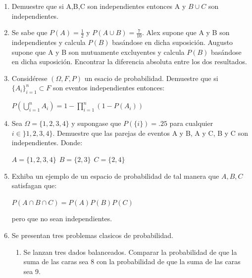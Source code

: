 \documentclass[12pt,a4paper]{report}
\begin{document}
\begin{enumerate}
   \item {
   Demuestre que si A,B,C son independientes entonces A y $B\cup C$ son independientes.

    }

   \item {
   Se sabe que $P(A)= \frac{1}{2}$ y $P(A\cup B)=\frac{7}{10}$. Alex supone que A y B son independientes y calcula $P(B)$ basándose en dicha suposición. Augusto supone que A y B son mutuamente excluyentes y calcula $P(B)$ basándose en dicha suposición. Encontrar la diferencia absoluta entre los dos resultados.
	}

   \item {
   Considérese $(\Omega,F, P)$ un esacio de probabilidad. Demuestre que si $\lbrace A_{i} \rbrace _{i=1}^{n} \subset F$ son eventos independientes entonces:\\
   \begin{center}
   $P(\bigcup\limits_{i=1}^{n} A_{i})=1-\prod\limits_{i=1}^{n} (1-P(A_{i}))$
   \end{center}
	}

   \item {
    Sea $\Omega = \lbrace 1,2,3,4 \rbrace$ y supongase que $P(\lbrace i \rbrace)=.25$ para cualquier $i\in \rbrace 1,2,3,4 \rbrace$. Demuestre que las parejas de eventos A y B, A y C, B y C son independientes. Donde:\\
    \begin{center}
    $A=\lbrace 1,2,3,4 \rbrace \ \ B=\lbrace 2,3 \rbrace \ \ C= \lbrace 2,4 \rbrace $
\end{center}
	}

   \item {
  Exhiba un ejemplo de un espacio de probabilidad de tal manera que $A,B,C$ satisfagan que: \\
  \begin{center}
  $P(A\cap B \cap C) = P(A)P(B)P(C)$
  \end{center}
  pero que no sean independientes.
	}

   \item {
    Se presentan tres problemas clasicos de probabilidad.

    \begin{enumerate}[label=\alph*) ]
    \item{Se lanzan tres dados balanceados. Comparar la probabilidad de que la suma de las caras sea 8 con la probabilidad de que la suma de las caras sea 9.
    }\\


\end{enumerate}}
\end{enumerate}
\end{document}
